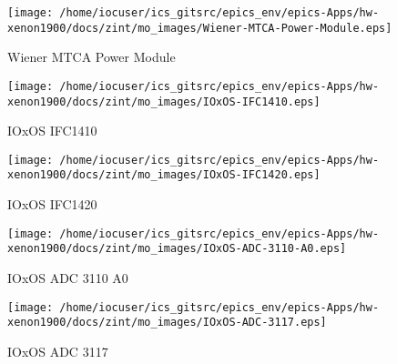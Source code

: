 \noindent
\vspace{1.4cm}
\begin{minipage}{.2\textwidth}
\begin{center}
\texttt{[image: /home/iocuser/ics\_gitsrc/epics\_env/epics-Apps/hw-xenon1900/docs/zint/mo\_images/Wiener-MTCA-Power-Module.eps]}
\end{center}
\end{minipage}
\begin{minipage}{.7\textwidth}
Wiener MTCA Power Module
\end{minipage}


\noindent
\vspace{1.4cm}
\begin{minipage}{.2\textwidth}
\begin{center}
\texttt{[image: /home/iocuser/ics\_gitsrc/epics\_env/epics-Apps/hw-xenon1900/docs/zint/mo\_images/IOxOS-IFC1410.eps]}
\end{center}
\end{minipage}
\begin{minipage}{.7\textwidth}
IOxOS IFC1410
\end{minipage}


\noindent
\vspace{1.4cm}
\begin{minipage}{.2\textwidth}
\begin{center}
\texttt{[image: /home/iocuser/ics\_gitsrc/epics\_env/epics-Apps/hw-xenon1900/docs/zint/mo\_images/IOxOS-IFC1420.eps]}
\end{center}
\end{minipage}
\begin{minipage}{.7\textwidth}
IOxOS IFC1420
\end{minipage}


\noindent
\vspace{1.4cm}
\begin{minipage}{.2\textwidth}
\begin{center}
\texttt{[image: /home/iocuser/ics\_gitsrc/epics\_env/epics-Apps/hw-xenon1900/docs/zint/mo\_images/IOxOS-ADC-3110-A0.eps]}
\end{center}
\end{minipage}
\begin{minipage}{.7\textwidth}
IOxOS ADC 3110 A0
\end{minipage}


\noindent
\vspace{1.4cm}
\begin{minipage}{.2\textwidth}
\begin{center}
\texttt{[image: /home/iocuser/ics\_gitsrc/epics\_env/epics-Apps/hw-xenon1900/docs/zint/mo\_images/IOxOS-ADC-3117.eps]}
\end{center}
\end{minipage}
\begin{minipage}{.7\textwidth}
IOxOS ADC 3117
\end{minipage}


